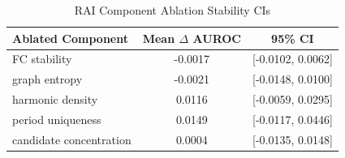 \begin{table}[htbp]
\centering
\caption{RAI Component Ablation Stability CIs}
\label{tab:ablation_stability}
\begin{tabular}{lcc}
\hline\hline
Ablated Component & Mean $\Delta$ AUROC & 95\% CI \\
\hline
FC stability & -0.0017 & [-0.0102, 0.0062] \\
graph entropy & -0.0021 & [-0.0148, 0.0100] \\
harmonic density & 0.0116 & [-0.0059, 0.0295] \\
period uniqueness & 0.0149 & [-0.0117, 0.0446] \\
candidate concentration & 0.0004 & [-0.0135, 0.0148] \\
\hline
\end{tabular}
\end{table}
